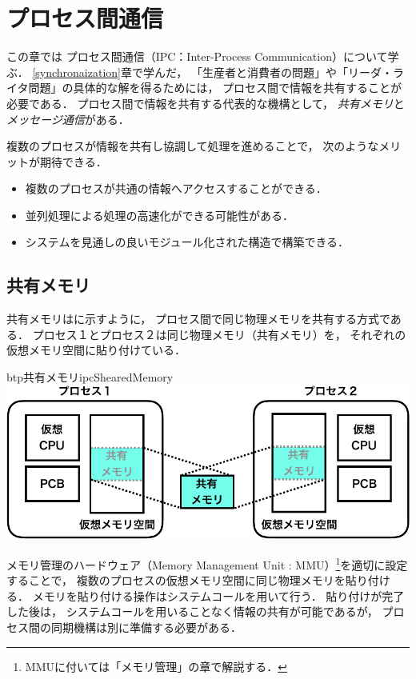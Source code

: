 \chapter{プロセス間通信}
\label{interProcessCommunication}
この章では
プロセス間通信（IPC：Inter-Process Communication）について学ぶ．
\ref{synchronaization}章で学んだ，
「生産者と消費者の問題」や「リーダ・ライタ問題」の具体的な解を得るためには，
プロセス間で情報を共有することが必要である．
プロセス間で情報を共有する代表的な機構として，
\emph{共有メモリ}と\emph{メッセージ通信}がある．

複数のプロセスが情報を共有し協調して処理を進めることで，
次のようなメリットが期待できる．

\begin{itemize}
\item 複数のプロセスが共通の情報へアクセスすることができる．
\item 並列処理による処理の高速化ができる可能性がある．
\item システムを見通しの良いモジュール化された構造で構築できる．
\end{itemize}

\section{共有メモリ}
共有メモリはに示すように，
プロセス間で同じ物理メモリを共有する方式である．
プロセス１とプロセス２は同じ物理メモリ（共有メモリ）を，
それぞれの仮想メモリ空間に貼り付けている．

\begin{myfig}{btp}{共有メモリ}{ipcShearedMemory}
  \includegraphics[scale=0.6]{Fig/ipcShearedMemory-crop.pdf}
\end{myfig}

メモリ管理のハードウェア（Memory Management Unit : MMU）\footnote{
  MMUに付いては「メモリ管理」の章で解説する．}を適切に設定することで，
複数のプロセスの仮想メモリ空間に同じ物理メモリを貼り付ける．
メモリを貼り付ける操作はシステムコールを用いて行う．
貼り付けが完了した後は，
システムコールを用いることなく情報の共有が可能であるが，
プロセス間の同期機構は別に準備する必要がある．

